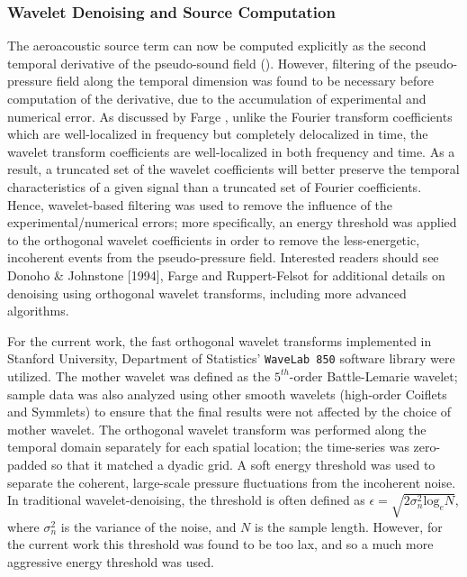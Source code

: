 \subsubsection{Wavelet Denoising and Source Computation}
The aeroacoustic source term can now be computed explicitly as the second temporal derivative of the pseudo-sound field ().
However, filtering of the pseudo-pressure field along the temporal dimension was found to be necessary before computation of the derivative, due to the accumulation of experimental and numerical error.
As discussed by Farge \citep{Farge1992}, unlike the Fourier transform coefficients which are well-localized in frequency but completely delocalized in time, the wavelet transform coefficients are well-localized in both frequency and time. 
As a result, a truncated set of the wavelet coefficients will better preserve the temporal characteristics of a given signal than a truncated set of Fourier coefficients.
Hence, wavelet-based filtering was used to remove the influence of the experimental/numerical errors; more specifically, an energy threshold was applied to the orthogonal wavelet coefficients in order to remove the less-energetic, incoherent events from the pseudo-pressure field.
Interested readers should see Donoho \& Johnstone [1994], Farge \etal [1999] and Ruppert-Felsot \etal [2009] for additional details on denoising using orthogonal wavelet transforms, including more advanced algorithms.

For the current work, the fast orthogonal wavelet transforms implemented in Stanford University, Department of Statistics' \texttt{WaveLab 850} software library were utilized.
The mother wavelet was defined as the $5^{th}$-order Battle-Lemarie wavelet; sample data was also analyzed using other smooth wavelets (high-order Coiflets and Symmlets) to ensure that the final results were not affected by the choice of mother wavelet.
The orthogonal wavelet transform was performed along the temporal domain separately for each spatial location; the time-series was zero-padded so that it matched a dyadic grid.
A soft energy threshold was used to separate the coherent, large-scale pressure fluctuations from the incoherent noise.
In traditional wavelet-denoising, the threshold is often defined as $\epsilon = \sqrt{2 \sigma^2_n \mathrm{log}_e N}$, where $\sigma^2_n$ is the variance of the noise, and $N$ is the sample length.
However, for the current work this threshold was found to be too lax, and so a much more aggressive energy threshold was used.

